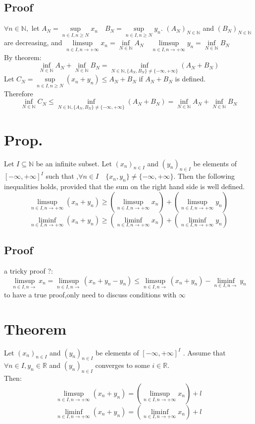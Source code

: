 \documentclass{book}
\begin{document}
\subsection{Proof}
$\forall n\in\mathbb{N} ,$ let $A_N=\sup\limits_{n\in I,n\geq N}x_n\quad B_N=\sup\limits_{n\in I,n\geq N}y_n$. $(A_N)_{N\in \mathbb{N} }$ and $(B_N)_{N\in \mathbb{N} }$ are decreasing, and $\limsup\limits_{n\in I,n\rightarrow+\infty}x_n=\inf\limits_{N\in \mathbb{N} }A_N\quad\limsup\limits_{n\in I,n\rightarrow+\infty}y_n=\inf\limits_{N\in \mathbb{N} }B_N$\\
By theorem:
$$\inf\limits_{N\in \mathbb{N} }A_N+\inf\limits_{N\in \mathbb{N} }B_N=\inf\limits_{N\in \mathbb{N},\{A_N,B_N\}\not=\{-\infty,+\infty\} }(A_N+B_N)$$
Let $C_N=\sup\limits_{n\in I,n\geq N}(x_n+y_n)\leq A_N+B_N$ if $A_N+B_N$ is defined.\\
Therefore $$\inf\limits_{N\in \mathbb{N} }C_N\leq\inf\limits_{N\in \mathbb{N},\{A_N,B_N\}\not=\{-\infty,+\infty\} }(A_N+B_N)=\inf\limits_{N\in \mathbb{N} }A_N+\inf\limits_{N\in \mathbb{N} }B_N$$
\section{Prop.}
Let $I\subseteq\mathbb{N} $ be an infinite subset. Let $(x_n)_{n\in I}$ and $(y_n)_{n\in I}$ be elements of $[-\infty,+\infty]^I$ such that ,$\forall n\in I\quad \{x_n,y_n\}\not=\{-\infty,+\infty\}$. Then the following inequalities holds, provided that the sum on the right hand side is well defined.
$$\limsup\limits_{n\in I,n\rightarrow+\infty}(x_n+y_n)\geq(\limsup\limits_{n\in I,n\rightarrow+\infty}x_n)+(\limsup\limits_{n\in I,n\rightarrow+\infty}y_n)$$
$$\liminf\limits_{n\in I,n\rightarrow+\infty}(x_n+y_n)\geq(\liminf\limits_{n\in I,n\rightarrow+\infty}x_n)+(\liminf\limits_{n\in I,n\rightarrow+\infty}y_n)$$
\subsection{Proof}
a tricky proof ?:
$$\limsup\limits_{n\in I,n\rightarrow}x_n=\limsup\limits_{n\in I,n\rightarrow}(x_n+y_n-y_n)\leq\limsup\limits_{n\in I,n\rightarrow}(x_n+y_n)-\liminf\limits_{n\in I,n\rightarrow}y_n$$
to have a true proof,only need to discuss conditions with $\infty$
\section{Theorem}
Let $(x_n)_{n\in I}$ and $(y_n)_{n\in I}$ be elements of $[-\infty,+\infty]^I$ . Assume that $\forall n\in I,y_n\in\mathbb{R} $ and $(y_n)_{n\in I}$ converges to some $i\in \mathbb{R} $.\\Then:
$$\limsup\limits_{n\in I,n\rightarrow+\infty}(x_n+y_n)=(\limsup\limits_{n\in I,n\rightarrow+\infty}x_n)+l$$
$$\liminf\limits_{n\in I,n\rightarrow+\infty}(x_n+y_n)=(\liminf\limits_{n\in I,n\rightarrow+\infty}x_n)+l$$
\end{document}
